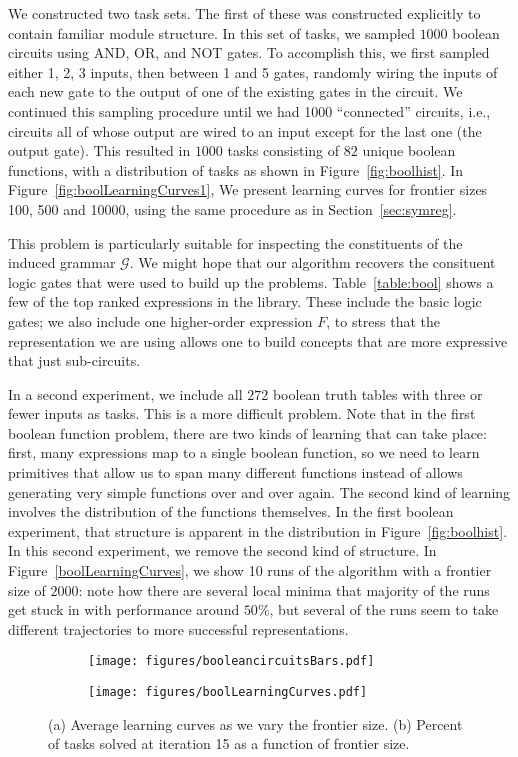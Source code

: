 \documentclass{article}
\begin{document}
We constructed two task sets. The first of these was constructed
explicitly to contain familiar module structure. In this set of tasks,
we sampled $1000$ boolean circuits using AND, OR, and NOT gates. To
accomplish this, we first sampled either 1, 2, 3 inputs, then between
1 and 5 gates, randomly wiring the inputs of each new gate to the
output of one of the existing gates in the circuit. We continued this
sampling procedure until we had 1000 ``connected'' circuits, i.e.,
circuits all of whose output are wired to an input except for the last
one (the output gate). This resulted in $1000$ tasks consisting of
$82$ unique boolean functions, with a distribution of tasks as shown
in Figure~\ref{fig:boolhist}. In Figure~\ref{fig:boolLearningCurves1},
We present learning curves for frontier sizes 100, 500 and 10000,
using the same procedure as in Section~\ref{sec:symreg}. 

This problem is particularly suitable for inspecting the constituents
of the induced grammar $\mathcal{G}$. We might hope that our algorithm
recovers the consituent logic gates that were used to build up the
problems. Table~\ref{table:bool} shows a few of the top ranked
expressions in the library. These include the basic logic gates; we
also include one higher-order expression $F$, to stress that the
representation we are using allows one to build concepts that are more
expressive that just sub-circuits.

In a second experiment, we include all $272$ boolean truth tables with
three or fewer inputs as tasks. This is a more difficult problem. Note
that in the first boolean function problem, there are two kinds of
learning that can take place: first, many expressions map to a single
boolean function, so we need to learn primitives that allow us to span
many different functions instead of allows generating very simple
functions over and over again. The second kind of learning involves
the distribution of the functions themselves. In the first boolean
experiment, that structure is apparent in the distribution in
Figure~\ref{fig:boolhist}. In this second experiment, we remove the
second kind of structure. In Figure~\ref{boolLearningCurves}, we show
10 runs of the algorithm with a frontier size of $2000$: note how
there are several local minima that majority of the runs get stuck in
with performance around $50\%$, but several of the runs seem to take
different trajectories to more successful representations. 

\begin{figure}
\begin{subfigure}[Before]{0.45\linewidth}
\texttt{[image: figures/booleancircuitsBars.pdf]}
\end{subfigure}
\begin{subfigure}[Before]{0.45\linewidth}
\texttt{[image: figures/boolLearningCurves.pdf]}
\end{subfigure}
\caption{(a) Average learning curves as we vary the frontier size. (b)
  Percent of tasks solved at iteration 15 as a function of frontier
  size.}
\label{fig:boolLearningCurves} 


\end{figure}
\end{document}
